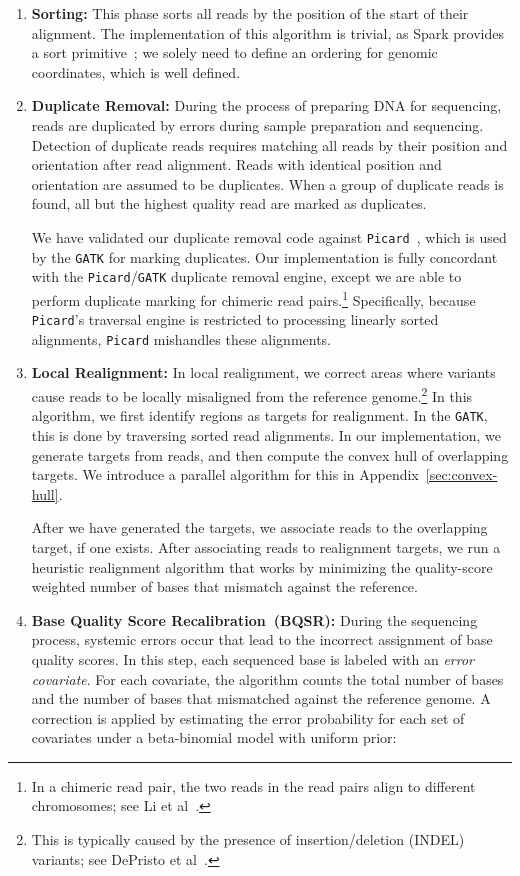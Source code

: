 \documentclass{acm_proc_article-sp}
\begin{document}
\begin{enumerate}
\item \textbf{Sorting:} This phase sorts all reads by the position of the start of their alignment. The implementation
of this algorithm is trivial, as Spark provides a sort primitive~\cite{zaharia10}; we solely need to define an
ordering for genomic coordinates, which is well defined.
\item \textbf{Duplicate Removal:} During the process of preparing DNA for sequencing, reads are duplicated by
errors during sample preparation and sequencing. Detection of duplicate reads requires matching all reads by their
position and orientation after read alignment. Reads with identical position and orientation are assumed to be
duplicates. When a group of duplicate reads is found, all but the highest quality read are marked as duplicates.

We have validated our duplicate removal code against \texttt{Picard}~\cite{picard}, which is used by the \texttt{GATK}
for marking duplicates. Our implementation is fully concordant with the \texttt{Picard}/\texttt{GATK} duplicate removal
engine, except we are able to perform duplicate marking for chimeric read pairs.\footnote{In a chimeric read pair,
the two reads in the read pairs align to different chromosomes; see Li et al~\cite{li10}.}
Specifically, because \texttt{Picard}'s traversal engine is restricted to processing linearly sorted alignments,
\texttt{Picard} mishandles these alignments.
\item \textbf{Local Realignment:} In local realignment, we correct areas where variants cause reads to be
locally misaligned from the reference genome.\footnote{This is typically caused by the presence of
insertion/deletion (INDEL) variants; see DePristo et al~\cite{depristo11}.} In this algorithm, we first identify regions
as targets for realignment. In the \texttt{GATK}, this is done by traversing sorted read alignments. In our implementation,
we generate targets from reads, and then compute the convex hull of overlapping targets. We introduce a parallel
algorithm for this in Appendix~\ref{sec:convex-hull}.

After we have generated the targets, we associate reads to the overlapping target, if one exists. After
associating reads to realignment targets, we run a heuristic realignment algorithm that works by minimizing
the quality-score weighted number of bases that mismatch against the reference.
\item \textbf{Base Quality Score Recalibration~(BQSR):} During the sequencing process, systemic errors occur
that lead to the incorrect assignment of base quality scores. In this step, each sequenced base is labeled with an
\emph{error covariate}. For each covariate, the algorithm counts the total number of bases and the number
of bases that mismatched against the reference genome. A correction is applied by estimating the error probability
for each set of covariates under a beta-binomial model with uniform prior:


\end{enumerate}
\end{document}

